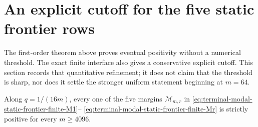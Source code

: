 \section{An explicit cutoff for the five static frontier rows}
\label{sec:terminal-modal-static-frontier-cutoff}

The first-order theorem above proves eventual positivity without a numerical
threshold.  The exact finite interface also gives a conservative explicit
cutoff.  This section records that quantitative refinement; it does not claim
that the threshold is sharp, nor does it settle the stronger uniform statement
beginning at $m=64$.

\begin{theorem}
\label{thm:terminal-modal-static-frontier-cutoff}
Along $q=1/(16m)$, every one of the five margins
$\mathcal M_{m,r}$ in
\eqref{eq:terminal-modal-static-frontier-finite-M1}--
\eqref{eq:terminal-modal-static-frontier-finite-Mr} is strictly positive for
every $m\ge4096$.
\end{theorem}

